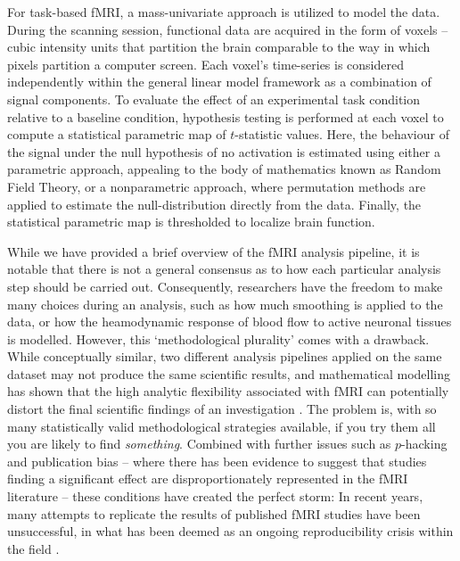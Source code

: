 For task-based fMRI, a mass-univariate approach is utilized to model the data. During the scanning session, functional data are acquired in the form of voxels -- cubic intensity units that partition the brain comparable to the way in which pixels partition a computer screen. Each voxel's time-series is considered independently within the general linear model framework as a combination of signal components. To evaluate the effect of an experimental task condition relative to a baseline condition, hypothesis testing is performed at each voxel to compute a statistical parametric map of $t$-statistic values. Here, the behaviour of the signal under the null hypothesis of no activation is estimated using either a parametric approach, appealing to the body of mathematics known as Random Field Theory, or a nonparametric approach, where permutation methods are applied to estimate the null-distribution directly from the data. Finally, the statistical parametric map is thresholded to localize brain function. 

While we have provided a brief overview of the fMRI analysis pipeline, it is notable that there is not a general consensus as to how each particular analysis step should be carried out. Consequently, researchers have the freedom to make many choices during an analysis, such as how much smoothing is applied to the data, or how the heamodynamic response of blood flow to active neuronal tissues is modelled. However, this `methodological plurality' comes with a drawback. While conceptually similar, two different analysis pipelines applied on the same dataset may not produce the same scientific results, and mathematical modelling has shown that the high analytic flexibility associated with fMRI can potentially distort the final scientific findings of an investigation \citep{Ioannidis2005-sy}. The problem is, with so many statistically valid methodological strategies available, if you try them all you are likely to find \textit{something}. Combined with further issues such as $p$-hacking and publication bias -- where there has been evidence to suggest that studies finding a significant effect are disproportionately represented in the fMRI literature \citep{David2013-iz, Ioannidis2014-yn} -- these conditions have created the perfect storm: In recent years, many attempts to replicate the results of published fMRI studies have been unsuccessful, in what has been deemed as an ongoing reproducibility crisis within the field \citep{Poldrack2017-rr, Gorgolewski2016-fk, Open_Science_Collaboration2015-gr}. 

